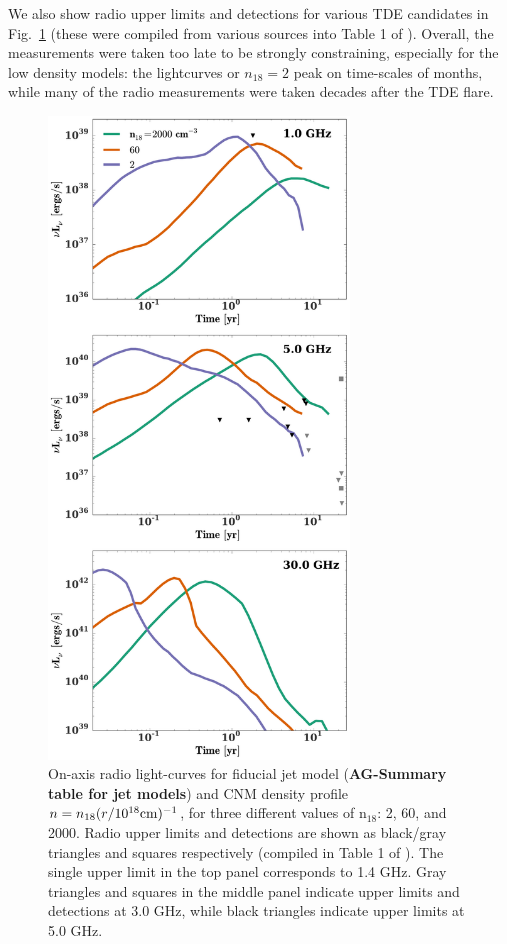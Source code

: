 \documentclass[usenatbib,fleqn]{mnras}
\begin{document}
We also show radio upper limits and detections for various TDE
candidates in Fig.~\ref{fig:upper_limits} (these were compiled from
various sources into Table 1 of \citealt{Mimica+2015}). Overall, the
measurements were taken too late to be strongly constraining,
especially for the low density models: the lightcurves or $n_{18}=2$
peak on time-scales of months, while many of the radio measurements
were taken decades after the TDE flare.

\begin{figure} 
  \includegraphics[width=8cm]{lightcurves.pdf}
  \caption{\label{fig:upper_limits} On-axis radio light-curves for
    fiducial jet model ({\bf AG-Summary table for jet models}) and CNM
    density profile $n=n_{18} (r/10^{18} {\rm cm})^{-1}$, for three
    different values of n$_{18}$: 2, 60, and 2000. Radio upper limits
    and detections are shown as black/gray triangles and squares
    respectively (compiled in Table 1 of \citealt{Mimica+2015}). The
    single upper limit in the top panel corresponds to 1.4 GHz. Gray
    triangles and squares in the middle panel indicate upper limits
    and detections at 3.0 GHz, while black triangles indicate upper
    limits at 5.0 GHz.}
\end{figure}
\end{document}

